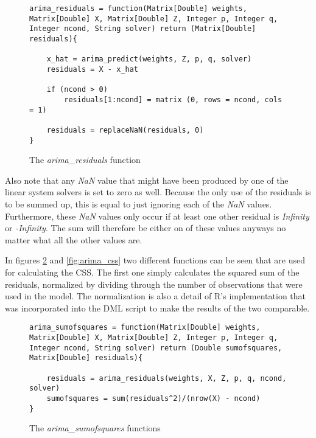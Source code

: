 \begin{figure}[!ht]
\centering
\begin{verbatim}
arima_residuals = function(Matrix[Double] weights, Matrix[Double] X, Matrix[Double] Z, Integer p, Integer q,  Integer ncond, String solver) return (Matrix[Double] residuals){
    
    x_hat = arima_predict(weights, Z, p, q, solver)
    residuals = X - x_hat
    
    if (ncond > 0) 
        residuals[1:ncond] = matrix (0, rows = ncond, cols = 1)
        
    residuals = replaceNaN(residuals, 0)
}
\end{verbatim}
\vspace*{-0.3cm}
\caption{The \textit{arima\_residuals} function}
\label{fig:arima_residuals}
\end{figure}

Also note that any \textit{NaN} value that might have been produced by one of the linear system solvers is set to zero as well. Because the only use of the residuals is to be summed up, this is equal to just ignoring each of the \textit{NaN} values. Furthermore, these \textit{NaN} values only occur if at least one other residual is \textit{Infinity} or \textit{-Infinity}. The sum will therefore be either on of these values anyways no matter what all the other values are.

In figures \ref{fig:arima_ssq} and \ref{fig:arima_css} two different functions can be seen that are used for calculating the \acl{CSS}. The first one simply calculates the squared sum of the residuals, normalized by dividing through the number of observations that were used in the model. The normalization is also a detail of R's implementation that was incorporated into the \acs{DML} script to make the results of the two comparable. 

\begin{figure}[!ht]
\centering
\begin{verbatim}
arima_sumofsquares = function(Matrix[Double] weights, Matrix[Double] X, Matrix[Double] Z, Integer p, Integer q,  Integer ncond, String solver) return (Double sumofsquares, Matrix[Double] residuals){

    residuals = arima_residuals(weights, X, Z, p, q, ncond, solver)
    sumofsquares = sum(residuals^2)/(nrow(X) - ncond)
}              
\end{verbatim}
\vspace*{-0.3cm}
\caption{The \textit{arima\_sumofsquares} functions}
\label{fig:arima_ssq}
\end{figure}

